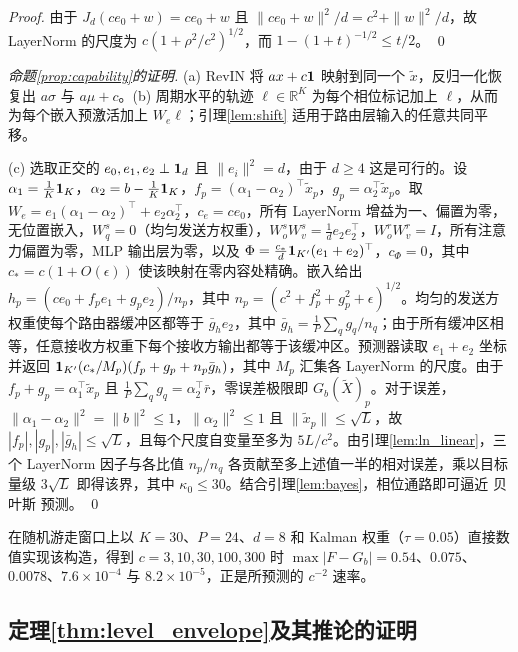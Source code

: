 {\begin{proof}
由于 $J_d(ce_0+w)=ce_0+w$ 且 $\|ce_0+w\|^2/d=c^2+\|w\|^2/d$，故 LayerNorm 的尺度为 $c(1+\rho^2/c^2)^{1/2}$，而 $1-(1+t)^{-1/2}\le t/2$。 \qed
\end{proof}

\begin{proof}[命题\ref{prop:capability}的证明]
(a) RevIN 将 $ax+c\mathbf 1$ 映射到同一个 $\tilde x$，反归一化恢复出 $a\sigma$ 与 $a\mu+c$。(b) 周期水平的轨迹 $\ell\in\mathbb R^K$ 为每个相位标记加上 $\ell$，从而为每个嵌入预激活加上 $W_e\ell$；引理\ref{lem:shift} 适用于路由层输入的任意共同平移。

(c) 选取正交的 $e_0,e_1,e_2\perp\mathbf 1_d$ 且 $\|e_i\|^2=d$，由于 $d\ge4$ 这是可行的。设 $\alpha_1=\tfrac1K\mathbf 1_K$，$\alpha_2=b-\tfrac1K\mathbf 1_K$，$f_p=(\alpha_1-\alpha_2)^\top\tilde x_p$，$g_p=\alpha_2^\top\tilde x_p$。取 $W_e=e_1(\alpha_1-\alpha_2)^\top+e_2\alpha_2^\top$，$c_e=ce_0$，所有 LayerNorm 增益为一、偏置为零，无位置嵌入，$W^s_q=0$（均匀发送方权重），$W^s_oW^s_v=\tfrac1de_2e_2^\top$，$W^r_oW^r_v=I$，所有注意力偏置为零，MLP 输出层为零，以及 $\Phi=\tfrac{c_*}{d}\mathbf 1_{K'}(e_1+e_2)^\top$，$c_\Phi=0$，其中 $c_*=c(1+O(\epsilon))$ 使该映射在零内容处精确。嵌入给出 $h_p=(ce_0+f_pe_1+g_pe_2)/n_p$，其中 $n_p=(c^2+f_p^2+g_p^2+\epsilon)^{1/2}$。均匀的发送方权重使每个路由器缓冲区都等于 $\bar g_he_2$，其中 $\bar g_h=\tfrac1P\sum_qg_q/n_q$；由于所有缓冲区相等，任意接收方权重下每个接收方输出都等于该缓冲区。预测器读取 $e_1+e_2$ 坐标并返回 $\mathbf 1_{K'}(c_*/M_p)(f_p+g_p+n_p\bar g_h)$，其中 $M_p$ 汇集各 LayerNorm 的尺度。由于 $f_p+g_p=\alpha_1^\top\tilde x_p$ 且 $\tfrac1P\sum_qg_q=\alpha_2^\top\bar r$，零误差极限即 $G_b(\tilde X)_p$。对于误差，$\|\alpha_1-\alpha_2\|^2=\|b\|^2\le1$，$\|\alpha_2\|^2\le1$ 且 $\|\tilde x_p\|\le\sqrt L$，故 $|f_p|,|g_p|,|\bar g_h|\le\sqrt L$，且每个尺度自变量至多为 $5L/c^2$。由引理\ref{lem:ln_linear}，三个 LayerNorm 因子与各比值 $n_p/n_q$ 各贡献至多上述值一半的相对误差，乘以目标量级 $3\sqrt L$ 即得该界，其中 $\kappa_0\le30$。结合引理\ref{lem:bayes}，相位通路即可逼近 贝叶斯 预测。 \qed
\end{proof}

在随机游走窗口上以 $K=30$、$P=24$、$d=8$ 和 Kalman 权重（$\tau=0.05$）直接数值实现该构造，得到 $c=3,10,30,100,300$ 时 $\max|F-G_b|=0.54$、$0.075$、$0.0078$、$7.6\times10^{-4}$ 与 $8.2\times10^{-5}$，正是所预测的 $c^{-2}$ 速率。

\subsection{定理\ref{thm:level_envelope}及其推论的证明}

}

